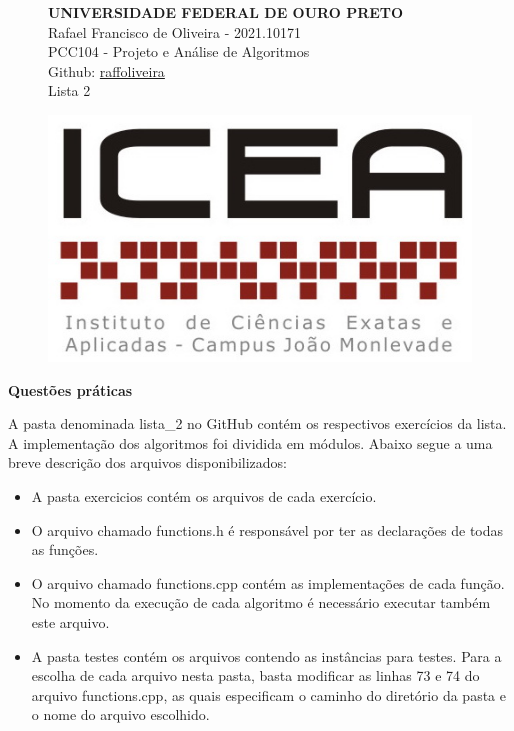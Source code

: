 \documentclass[12pt,a4paper]{article}
\begin{document}
\begin{figure}[H]
\begin{minipage}[]{0.07\linewidth}
	\end{minipage}
\hfill
	\begin{minipage}[]{0.6\linewidth}
		\centering
	\textbf{UNIVERSIDADE FEDERAL DE OURO PRETO\\}
		Rafael Francisco de Oliveira - 2021.10171\\
		PCC104 - Projeto e Análise de Algoritmos\\
		Github: \href{https://github.com/raffoliveira/Master_Degree}{raffoliveira}\\
		Lista 2
		
	\end{minipage}
\hfill	
	\begin{minipage}[c]{0.15\linewidth}
	\includegraphics[width=\linewidth]{images/icea.jpg}	
	\end{minipage}

\vspace{0.5cm}
\hrulefill
\end{figure}

{\Large \textbf{Questões práticas}}

\vspace{0.5cm}

A pasta denominada \textsf{lista\_2} no GitHub contém os respectivos exercícios da lista. A implementação dos algoritmos foi dividida em módulos. Abaixo segue a uma breve descrição dos arquivos disponibilizados:

\begin{itemize}
	\item A pasta \textsf{exercicios} contém os arquivos de cada exercício.
	\item O arquivo chamado \textsf{functions.h} é responsável por ter as declarações de todas as funções.
	\item O arquivo chamado \textsf{functions.cpp} contém as implementações de cada função. No momento da execução de cada algoritmo é necessário executar também este arquivo.
	\item A pasta \textsf{testes} contém os arquivos contendo as instâncias para testes. Para a escolha de cada arquivo nesta pasta, basta modificar as linhas \textsf{73} e \textsf{74} do arquivo \textsf{functions.cpp}, as quais especificam o caminho do diretório da pasta e o nome do arquivo escolhido.
\end{itemize}
\end{document}
